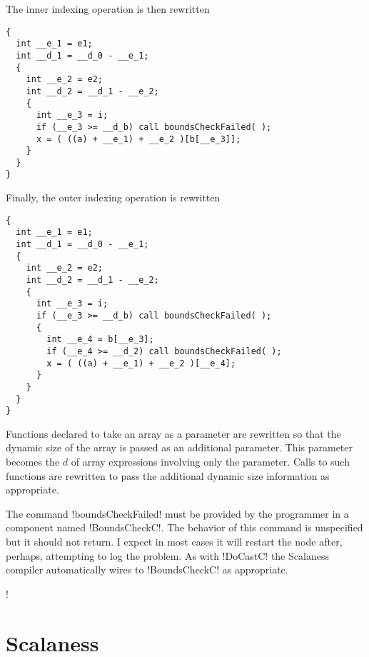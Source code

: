 The inner indexing operation is then rewritten

\singlespace
\begin{lstlisting}[language=nesC]
{
  int __e_1 = e1;
  int __d_1 = __d_0 - __e_1;
  {
    int __e_2 = e2;
    int __d_2 = __d_1 - __e_2;
    {
      int __e_3 = i;
      if (__e_3 >= __d_b) call boundsCheckFailed( );
      x = ( ((a) + __e_1) + __e_2 )[b[__e_3]];
    }
  }
}
\end{lstlisting}
\primaryspacing

Finally, the outer indexing operation is rewritten

\singlespace
\begin{lstlisting}[language=nesC]
{
  int __e_1 = e1;
  int __d_1 = __d_0 - __e_1;
  {
    int __e_2 = e2;
    int __d_2 = __d_1 - __e_2;
    {
      int __e_3 = i;
      if (__e_3 >= __d_b) call boundsCheckFailed( );
      {
        int __e_4 = b[__e_3];
        if (__e_4 >= __d_2) call boundsCheckFailed( );
        x = ( ((a) + __e_1) + __e_2 )[__e_4];
      }
    }
  }
}
\end{lstlisting}
\primaryspacing


Functions declared to take an array as a parameter are rewritten so that the dynamic size of the
array is passed as an additional parameter. This parameter becomes the $d$ of array expressions
involving only the parameter. Calls to such functions are rewritten to pass the additional
dynamic size information as appropriate.

The command !boundsCheckFailed! must be provided by the programmer in a component named
!BoundsCheckC!. The behavior of this command is unspecified but it should not return. I expect
in most cases it will restart the node after, perhaps, attempting to log the problem. As with
!DoCastC! the Scalaness compiler automatically wires to !BoundsCheckC! as appropriate.

\lstDeleteShortInline!

\section{Scalaness}
\label{section-scalaness-implementation}

